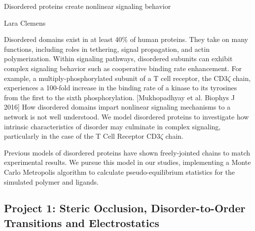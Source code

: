 \documentclass[onecolumn]{article}
\begin{document}
\newcommand{\citel}[1]{\citep{#1}}
\newcommand{\citelt}[1]{\citet{#1}}

\def\Tevac{T_{1/2}^{\mbox{\,\scriptsize evac}}}
\def\Treturn{T_{1/2}^{\mbox{\,\scriptsize return}}}
\def\toffbar{\bar{t}_{\mbox{\scriptsize off}}}
\def\toff{{t}_{\mbox{\scriptsize off}}}
\def\Peclet{P\'{e}clet}


\begin{center}
\Large
Disordered proteins create nonlinear signaling behavior

\large
Lara Clemens
\date{}

\end{center}
\normalsize



Disordered domains exist in at least 40\% of human proteins. They take on many functions, including roles in tethering, signal propagation, and actin polymerization. Within signaling pathways, disordered subunits can exhibit complex signaling behavior such as cooperative binding rate enhancement. For example, a multiply-phosphorylated subunit of a T cell receptor, the CD3$\zeta$ chain, experiences a 100-fold increase in the binding rate of a kinase to its tyrosines from the first to the sixth phosphorylation. [Mukhopadhyay et al. Biophys J 2016] How disordered domains impart nonlinear signaling mechanisms to a network is not well understood. We model disordered proteins to investigate how intrinsic characteristics of disorder may culminate in complex signaling, particularly in the case of the T Cell Receptor CD3$\zeta$ chain. 

Previous models of disordered proteins have shown freely-jointed chains to match experimental results. We pursue this model in our studies, implementing a Monte Carlo Metropolis algorithm to calculate pseudo-equilibrium statistics for the simulated polymer and ligands. 

\subsection*{Project 1: Steric Occlusion, Disorder-to-Order Transitions and Electrostatics}
\end{document}
